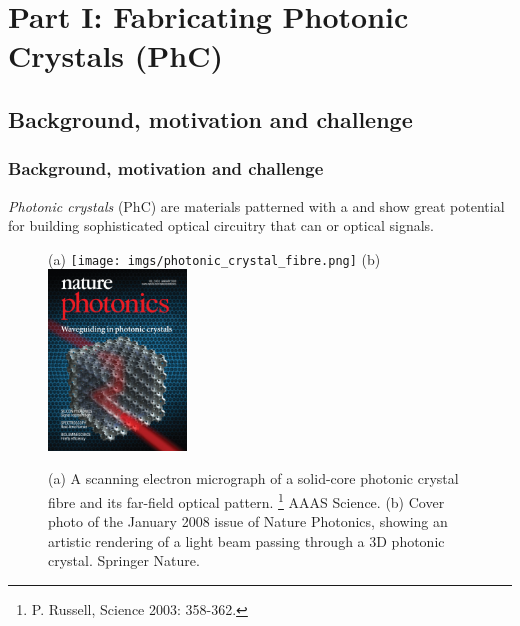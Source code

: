 \hypertarget{part1}{%
  \section{Part I: Fabricating Photonic Crystals (PhC)}}

\hypertarget{background1}{%
  \subsection{Background, motivation and challenge}}

\begin{frame}
  \frametitle{Background, motivation and challenge}

  \emph{Photonic crystals} (PhC) are materials patterned with a 
  and show great potential for building sophisticated optical circuitry that can
   or  optical signals.

  \bigskip
  
  \begin{figure}
    \centering 
    (a)
    \texttt{[image: imgs/photonic\_crystal\_fibre.png]} 
    (b)
    \includegraphics[height=4.8cm]{../imgs/photonics_cover.jpg} 
    \caption{
      (a) A scanning electron micrograph of a solid-core photonic crystal fibre and its far-field optical pattern.%
      \footnote{P. Russell, Science 2003: 358-362.}
      \textcopyright \enspace AAAS Science.
      (b) Cover photo of the January 2008 issue of Nature Photonics,
      showing an artistic rendering of a light beam passing through a 3D photonic crystal.
      \textcopyright \enspace Springer Nature.}
    \label{fig:photonic-flow}
  \end{figure}
  
\end{frame}

